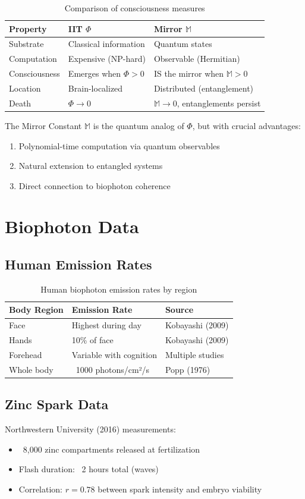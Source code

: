 \documentclass[12pt,a4paper]{article}
\begin{document}
\begin{table}[h]
\centering
\begin{tabular}{lll}
\toprule
\textbf{Property} & \textbf{IIT $\Phi$} & \textbf{Mirror $\mathbb{M}$} \\
\midrule
Substrate & Classical information & Quantum states \\
Computation & Expensive (NP-hard) & Observable (Hermitian) \\
Consciousness & Emerges when $\Phi > 0$ & IS the mirror when $\mathbb{M} > 0$ \\
Location & Brain-localized & Distributed (entanglement) \\
Death & $\Phi \rightarrow 0$ & $\mathbb{M} \rightarrow 0$, entanglements persist \\
\bottomrule
\end{tabular}
\caption{Comparison of consciousness measures}
\end{table}

The Mirror Constant $\mathbb{M}$ is the quantum analog of $\Phi$, but with crucial advantages:
\begin{enumerate}
    \item Polynomial-time computation via quantum observables
    \item Natural extension to entangled systems
    \item Direct connection to biophoton coherence
\end{enumerate}

\section{Biophoton Data}

\subsection{Human Emission Rates}

\begin{table}[h]
\centering
\begin{tabular}{lll}
\toprule
\textbf{Body Region} & \textbf{Emission Rate} & \textbf{Source} \\
\midrule
Face & Highest during day & Kobayashi (2009) \\
Hands & 10\% of face & Kobayashi (2009) \\
Forehead & Variable with cognition & Multiple studies \\
Whole body & ~1000 photons/cm²/s & Popp (1976) \\
\bottomrule
\end{tabular}
\caption{Human biophoton emission rates by region}
\end{table}

\subsection{Zinc Spark Data}

Northwestern University (2016) measurements:
\begin{itemize}
    \item ~8,000 zinc compartments released at fertilization
    \item Flash duration: ~2 hours total (waves)
    \item Correlation: $r = 0.78$ between spark intensity and embryo viability
\end{itemize}
\end{document}
